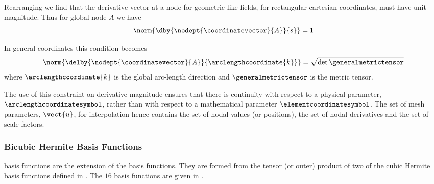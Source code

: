Rearranging  we find that the \arclen derivative vector at a
node for geometric like fields, for rectangular cartesian coordinates, must
have unit magnitude. Thus for global node $A$ we have
\begin{equation}
  \norm{\dby{\nodept{\coordinatevector}{A}}{s}}=1
  \label{eqn:chnormconstraint}
\end{equation}

In general coordinates this condition becomes
\begin{equation}
  \norm{\delby{\nodept{\coordinatevector}{A}}{\arclengthcoordinate{k}}}=\sqrt{\det{\generalmetrictensor}}
  \label{eqn:genchnormconstraint}
\end{equation}
where $\arclengthcoordinate{k}$ is the  global arc-length direction and $\generalmetrictensor$ is the metric tensor.

The use of this constraint on \arclen derivative magnitude ensures that there is continuity with respect to a physical parameter,
$\arclengthcoordinatesymbol$, rather than with respect to a mathematical parameter $\elementcoordinatesymbol$. The set of
mesh parameters, $\vect{u}$, for \cubicherm interpolation hence contains the
set of nodal values (or positions), the set of nodal \arclen derivatives and
the set of scale factors.

\subsubsection{Bicubic Hermite Basis Functions}

\Bicubicherm basis functions are the \twodal extension of the \onedal
\cubicherm basis functions. They are formed from the tensor (or outer) product
of two of the \onedal cubic Hermite basis functions defined in
. The $16$ \bicubicherm basis functions are given in .

